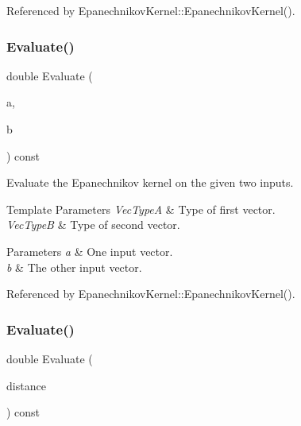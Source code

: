 Referenced by Epanechnikov\+Kernel\+::\+Epanechnikov\+Kernel().

\mbox{\label{classmlpack_1_1kernel_1_1EpanechnikovKernel_a84c3aeba25ea7703bd2d4f85a54301da}} 
\subsubsection{Evaluate()\hspace{0.1cm}{\footnotesize\ttfamily [1/2]}}
{\footnotesize\ttfamily double Evaluate (\begin{DoxyParamCaption}\item[{const Vec\+TypeA \&}]{a,  }\item[{const Vec\+TypeB \&}]{b }\end{DoxyParamCaption}) const}



Evaluate the Epanechnikov kernel on the given two inputs. 


\begin{DoxyTemplParams}{Template Parameters}
{\em Vec\+TypeA} & Type of first vector. \\
\hline
{\em Vec\+TypeB} & Type of second vector. \\
\hline
\end{DoxyTemplParams}

\begin{DoxyParams}{Parameters}
{\em a} & One input vector. \\
\hline
{\em b} & The other input vector. \\
\hline
\end{DoxyParams}


Referenced by Epanechnikov\+Kernel\+::\+Epanechnikov\+Kernel().

\mbox{\label{classmlpack_1_1kernel_1_1EpanechnikovKernel_a5602dee5d3ad98a183b9a11d9e0ed225}} 
\subsubsection{Evaluate()\hspace{0.1cm}{\footnotesize\ttfamily [2/2]}}
{\footnotesize\ttfamily double Evaluate (\begin{DoxyParamCaption}\item[{const double}]{distance }\end{DoxyParamCaption}) const}



